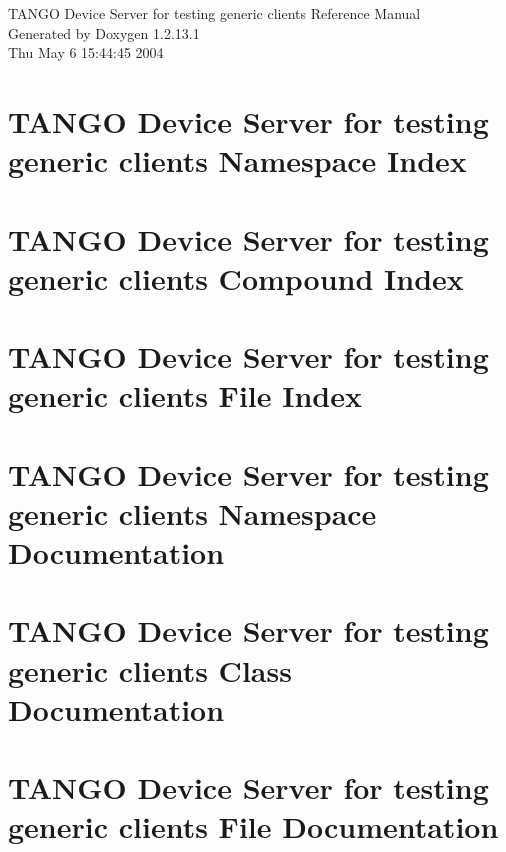 \documentclass[a4paper]{book}
\begin{document}
\begin{titlepage}
\vspace*{7cm}
\begin{center}
{\Large TANGO Device Server for testing generic clients Reference Manual}\\
\vspace*{1cm}
{\large Generated by Doxygen 1.2.13.1}\\
\vspace*{0.5cm}
{\small Thu May 6 15:44:45 2004}\\
\end{center}
\end{titlepage}
\clearemptydoublepage
{}
\tableofcontents
\clearemptydoublepage
{}
\chapter{TANGO Device Server for testing generic clients Namespace Index}

\chapter{TANGO Device Server for testing generic clients Compound Index}

\chapter{TANGO Device Server for testing generic clients File Index}

\chapter{TANGO Device Server for testing generic clients Namespace Documentation}

\chapter{TANGO Device Server for testing generic clients Class Documentation}






















\chapter{TANGO Device Server for testing generic clients File Documentation}






\printindex
\end{document}

